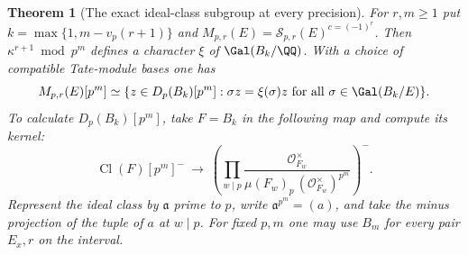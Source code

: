 \documentclass[a4paper,11pt]{article}
\newtheorem{theorem}[proposition]{Theorem}
\theoremstyle{definition}
\theoremstyle{remark}
\numberwithin{equation}{section}
\newcommand{\Cl}{\operatorname{Cl}}
\begin{document}
\begin{theorem}[The exact ideal-class subgroup at every precision]\leavevmode
\label{thm:idealprecision608}
For \(r,m\ge1\) put \(k=\max\{1,m-v_p(r+1)\}\) and
\(M_{p,r}(E)=\mathcal S_{p,r}(E)^{c=(-1)^r}\). Then
\(\kappa^{r+1}\bmod p^m\) defines a character \(\xi\) of
\(\Gal(B_k/\QQ)\). With a choice of compatible Tate-module bases
one has
\[
 M_{p,r}(E)[p^m]\simeq
 \{z\in D_p(B_k)[p^m]:\sigma z=\xi(\sigma)z
                               \text{ for all }\sigma\in\Gal(B_k/E)\}.
\]
To calculate \(D_p(B_k)[p^m]\), take \(F=B_k\) in the following
map and compute its kernel:
\[
 \Cl(F)[p^m]^-\ \longrightarrow\
 \left(\prod_{w\mid p}
  \frac{\mathcal O_{F_w}^\times}
       {\mu(F_w)_p\,(\mathcal O_{F_w}^\times)^{p^m}}\right)^- .
\]
Represent the ideal class by \(\mathfrak a\) prime to \(p\),
write \(\mathfrak a^{p^m}=(a)\), and take the minus projection
of the tuple of \(a\) at \(w\mid p\). For fixed \(p,m\) one may
use \(B_m\) for every pair \(E_x,r\) on the interval.
\end{theorem}
\end{document}
